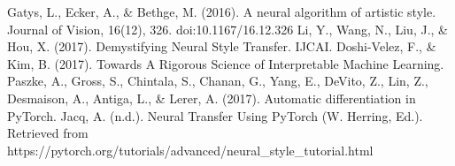 \documentclass[runningheads]{llncs}
\begin{document}
\begin{thebibliography}{8}
Gatys, L., Ecker, A., \& Bethge, M. (2016). A neural algorithm of artistic style. Journal of Vision, 16(12), 326. doi:10.1167/16.12.326
Li, Y., Wang, N., Liu, J., \& Hou, X. (2017). Demystifying Neural Style Transfer. IJCAI.
Doshi-Velez, F., \& Kim, B. (2017). Towards A Rigorous Science of Interpretable Machine Learning.
Paszke, A., Gross, S., Chintala, S., Chanan, G., Yang, E., DeVito, Z., Lin, Z., Desmaison, A., Antiga, L., \& Lerer, A. (2017). Automatic differentiation in PyTorch.
Jacq, A. (n.d.). Neural Transfer Using PyTorch (W. Herring, Ed.). Retrieved from https://pytorch.org/tutorials/advanced/neural\_style\_tutorial.html
\end{thebibliography}
\end{document}
